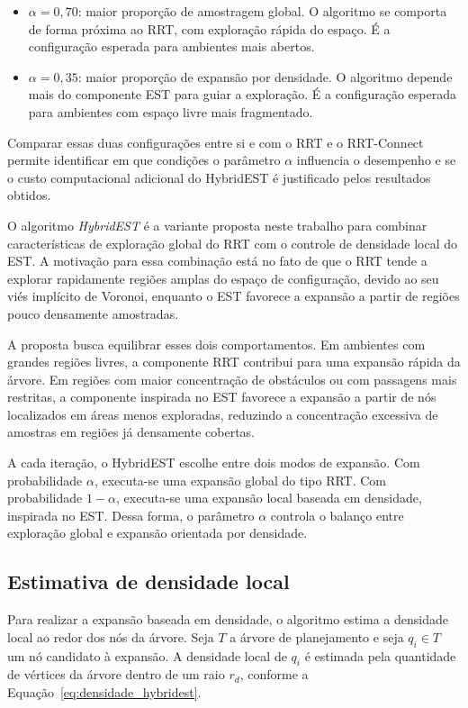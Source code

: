 \begin{itemize}
    \item $\alpha = 0{,}70$: maior proporção de amostragem global. O algoritmo se comporta de forma próxima ao RRT, com exploração rápida do espaço. É a configuração esperada para ambientes mais abertos.

    \item $\alpha = 0{,}35$: maior proporção de expansão por densidade. O algoritmo depende mais do componente EST para guiar a exploração. É a configuração esperada para ambientes com espaço livre mais fragmentado.
\end{itemize}

Comparar essas duas configurações entre si e com o RRT e o RRT-Connect permite identificar em que condições o parâmetro $\alpha$ influencia o desempenho e se o custo computacional adicional do HybridEST é justificado pelos resultados obtidos.

O algoritmo \emph{HybridEST} é a variante proposta neste trabalho para combinar características de exploração global do RRT com o controle de densidade local do EST. A motivação para essa combinação está no fato de que o RRT tende a explorar rapidamente regiões amplas do espaço de configuração, devido ao seu viés implícito de Voronoi, enquanto o EST favorece a expansão a partir de regiões pouco densamente amostradas.

A proposta busca equilibrar esses dois comportamentos. Em ambientes com grandes regiões livres, a componente RRT contribui para uma expansão rápida da árvore. Em regiões com maior concentração de obstáculos ou com passagens mais restritas, a componente inspirada no EST favorece a expansão a partir de nós localizados em áreas menos exploradas, reduzindo a concentração excessiva de amostras em regiões já densamente cobertas.

A cada iteração, o HybridEST escolhe entre dois modos de expansão. Com probabilidade $\alpha$, executa-se uma expansão global do tipo RRT. Com probabilidade $1-\alpha$, executa-se uma expansão local baseada em densidade, inspirada no EST. Dessa forma, o parâmetro $\alpha$ controla o balanço entre exploração global e expansão orientada por densidade.

\subsection{Estimativa de densidade local}
\label{subsec:densidade_hybridest}

Para realizar a expansão baseada em densidade, o algoritmo estima a densidade local ao redor dos nós da árvore. Seja $T$ a árvore de planejamento e seja $q_i \in T$ um nó candidato à expansão. A densidade local de $q_i$ é estimada pela quantidade de vértices da árvore dentro de um raio $r_d$, conforme a Equação~\ref{eq:densidade_hybridest}.


